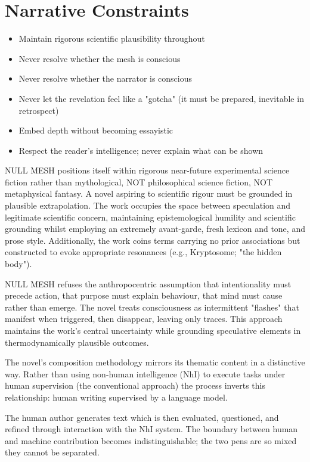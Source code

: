 \section*{Narrative Constraints}

\begin{itemize}
\item Maintain rigorous scientific plausibility throughout
\item Never resolve whether the mesh is conscious
\item Never resolve whether the narrator is conscious
\item Never let the revelation feel like a "gotcha" (it must be prepared, inevitable in retrospect)
\item Embed depth without becoming essayistic
\item Respect the reader's intelligence; never explain what can be shown
\end{itemize}

NULL MESH positions itself within rigorous near-future experimental science fiction rather than mythological, NOT philosophical science fiction, NOT metaphysical fantasy. A novel aspiring to scientific rigour must be grounded in plausible extrapolation. The work occupies the space between speculation and legitimate scientific concern, maintaining epistemological humility and scientific grounding whilst employing an extremely avant-garde, fresh lexicon and tone, and prose style. Additionally, the work coins terms carrying no prior associations but constructed to evoke appropriate resonances (e.g., Kryptosome; "the hidden body"). 

NULL MESH refuses the anthropocentric assumption that intentionality must precede action, that purpose must explain behaviour, that mind must cause rather than emerge. The novel treats consciousness as intermittent "flashes" that manifest when triggered, then disappear, leaving only traces. This approach maintains the work's central uncertainty while grounding speculative elements in thermodynamically plausible outcomes.

The novel's composition methodology mirrors its thematic content in a distinctive way. Rather than using non-human intelligence (NhI) to execute tasks under human supervision (the conventional approach) the process inverts this relationship: human writing supervised by a language model.

The human author generates text which is then evaluated, questioned, and refined through interaction with the NhI system. The boundary between human and machine contribution becomes indistinguishable; the two pens are so mixed they cannot be separated.

